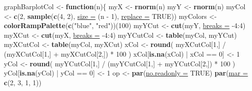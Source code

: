\documentclass[twoside,symmetric]{book}
\newenvironment{Shaded}{}{}
\newcommand{\ControlFlowTok}[1]{\textbf{#1}}
\newcommand{\DataTypeTok}[1]{\underline{#1}}
\newcommand{\DecValTok}[1]{#1}
\newcommand{\KeywordTok}[1]{\textbf{#1}}
\newcommand{\NormalTok}[1]{#1}
\newcommand{\OperatorTok}[1]{#1}
\newcommand{\OtherTok}[1]{#1}
\newcommand{\StringTok}[1]{#1}
\begin{document}
\begin{Shaded}
\begin{Highlighting}[]
\NormalTok{graphBarplotCol <-}\StringTok{ }\ControlFlowTok{function}\NormalTok{(n)\{}
\NormalTok{  myX <-}\StringTok{ }\KeywordTok{rnorm}\NormalTok{(n)}
\NormalTok{  myY <-}\StringTok{ }\KeywordTok{rnorm}\NormalTok{(n)}
\NormalTok{  myCol <-}\StringTok{ }\KeywordTok{c}\NormalTok{(}\DecValTok{2}\NormalTok{, }\KeywordTok{sample}\NormalTok{(}\KeywordTok{c}\NormalTok{(}\DecValTok{4}\NormalTok{, }\DecValTok{2}\NormalTok{), }\DataTypeTok{size =}\NormalTok{ (n }\OperatorTok{-}\StringTok{ }\DecValTok{1}\NormalTok{), }\DataTypeTok{replace =} \OtherTok{TRUE}\NormalTok{))}
\NormalTok{  myColors <-}\StringTok{ }\KeywordTok{colorRampPalette}\NormalTok{(}\KeywordTok{c}\NormalTok{(}\StringTok{"blue"}\NormalTok{, }\StringTok{"red"}\NormalTok{))(}\DecValTok{100}\NormalTok{)}
\NormalTok{  myYCut <-}\StringTok{ }\KeywordTok{cut}\NormalTok{(myY, }\DataTypeTok{breaks =} \DecValTok{-4}\OperatorTok{:}\DecValTok{4}\NormalTok{)}
\NormalTok{  myXCut <-}\StringTok{ }\KeywordTok{cut}\NormalTok{(myX, }\DataTypeTok{breaks =} \DecValTok{-4}\OperatorTok{:}\DecValTok{4}\NormalTok{)}
\NormalTok{  myYCutCol <-}\StringTok{ }\KeywordTok{table}\NormalTok{(myCol, myYCut)}
\NormalTok{  myXCutCol <-}\StringTok{ }\KeywordTok{table}\NormalTok{(myCol, myXCut)}
\NormalTok{  xCol <-}\StringTok{ }\KeywordTok{round}\NormalTok{(}
\NormalTok{    myXCutCol[}\DecValTok{1}\NormalTok{,] }\OperatorTok{/}\StringTok{ }\NormalTok{(myXCutCol[}\DecValTok{1}\NormalTok{,] }\OperatorTok{+}\StringTok{ }\NormalTok{myXCutCol[}\DecValTok{2}\NormalTok{,]) }\OperatorTok{*}\StringTok{ }\DecValTok{100}
\NormalTok{  )}
\NormalTok{  xCol[}\KeywordTok{is.na}\NormalTok{(xCol) }\OperatorTok{|}\StringTok{ }\NormalTok{xCol }\OperatorTok{==}\StringTok{ }\DecValTok{0}\NormalTok{] <-}\StringTok{ }\DecValTok{1}
\NormalTok{  yCol <-}\StringTok{ }\KeywordTok{round}\NormalTok{(}
\NormalTok{    myYCutCol[}\DecValTok{1}\NormalTok{,] }\OperatorTok{/}\StringTok{ }\NormalTok{(myYCutCol[}\DecValTok{1}\NormalTok{,] }\OperatorTok{+}\StringTok{ }\NormalTok{myYCutCol[}\DecValTok{2}\NormalTok{,]) }\OperatorTok{*}\StringTok{ }\DecValTok{100}
\NormalTok{  )}
\NormalTok{  yCol[}\KeywordTok{is.na}\NormalTok{(yCol) }\OperatorTok{|}\StringTok{ }\NormalTok{yCol }\OperatorTok{==}\StringTok{ }\DecValTok{0}\NormalTok{] <-}\StringTok{ }\DecValTok{1}
\NormalTok{  op <-}\StringTok{ }\KeywordTok{par}\NormalTok{(}\DataTypeTok{no.readonly =} \OtherTok{TRUE}\NormalTok{)}
  \KeywordTok{par}\NormalTok{(}\DataTypeTok{mar =} \KeywordTok{c}\NormalTok{(}\DecValTok{2}\NormalTok{, }\DecValTok{3}\NormalTok{, }\DecValTok{1}\NormalTok{, }\DecValTok{1}\NormalTok{))}

\end{Highlighting}
\end{Shaded}
\end{document}
